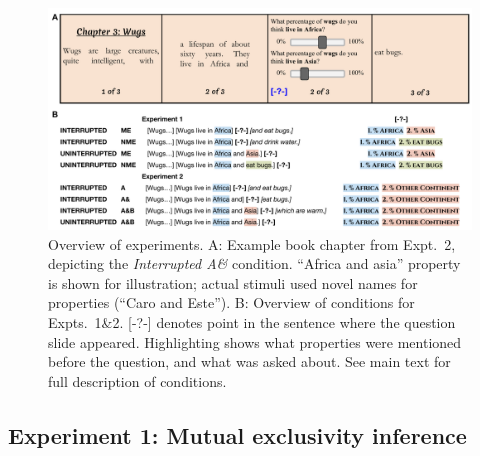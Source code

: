 \documentclass[10pt,letterpaper]{article}
\newcommand{\red}[1]{{\textcolor{Red}{#1}}}
\begin{document}


\begin{figure}[h]
  \centering
    \includegraphics[width=1\textwidth]{design}
    \vspace{-0.8cm}
  \caption{Overview of experiments. A: Example book chapter from Expt.~2, depicting the \emph{Interrupted A\&} condition. ``Africa and asia'' property is shown for illustration; actual stimuli used novel names for properties (``Caro and Este''). B: Overview of conditions for Expts.~1\&2. [-?-] denotes point in the sentence where the question slide appeared. Highlighting shows what properties were mentioned before the question, and what was asked about. See main text for full description of conditions.}
  \label{fig:design}
          \vspace{-0.5cm}
\end{figure}

\subsection{Experiment 1: Mutual exclusivity inference}

\end{document}
